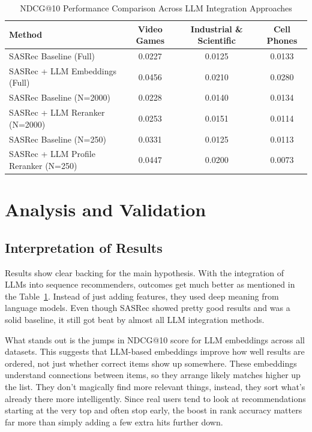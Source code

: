 \documentclass[conference]{IEEEtran}
\begin{document}
 
\begin{table}[t]
\caption{NDCG@10 Performance Comparison Across LLM Integration Approaches}
\label{tab:ndcg_results}
\begin{center}
\begin{tabular}{|l|c|c|c|}
\hline
\textbf{Method} & \textbf{Video Games} & \textbf{Industrial \& Scientific} & \textbf{Cell Phones} \\
\hline
SASRec Baseline (Full) & 0.0227 & 0.0125 & 0.0133 \\
\hline
SASRec + LLM Embeddings (Full) & 0.0456 & 0.0210 & 0.0280 \\
\hline
SASRec Baseline (N=2000) & 0.0228 & 0.0140 & 0.0134 \\
\hline
SASRec + LLM Reranker (N=2000) & 0.0253 & 0.0151 & 0.0114 \\
\hline
SASRec Baseline (N=250) & 0.0331 & 0.0125 & 0.0113 \\
\hline
SASRec + LLM Profile Reranker (N=250) & 0.0447 & 0.0200 & 0.0073 \\
\hline
\end{tabular}
\end{center}
\end{table}



\section{Analysis and Validation}
\subsection{Interpretation of Results}
Results show clear backing for the main hypothesis. With the integration of LLMs into sequence recommenders, outcomes get much better as mentioned in the Table~\ref{tab:ndcg_results}. Instead of just adding features, they used deep meaning from language models. Even though SASRec showed pretty good results and was a solid baseline, it still got beat by almost all LLM integration methods. 

What stands out is the jumps in NDCG@10 score for LLM embeddings across all datasets. This suggests that LLM-based embeddings improve how well results are ordered, not just whether correct items show up somewhere. These embeddings understand connections between items, so they arrange likely matches higher up the list. They don’t magically find more relevant things, instead, they sort what’s already there more intelligently. Since real users tend to look at recommendations starting at the very top and often stop early, the boost in rank accuracy matters far more than simply adding a few extra hits further down.
\end{document}
